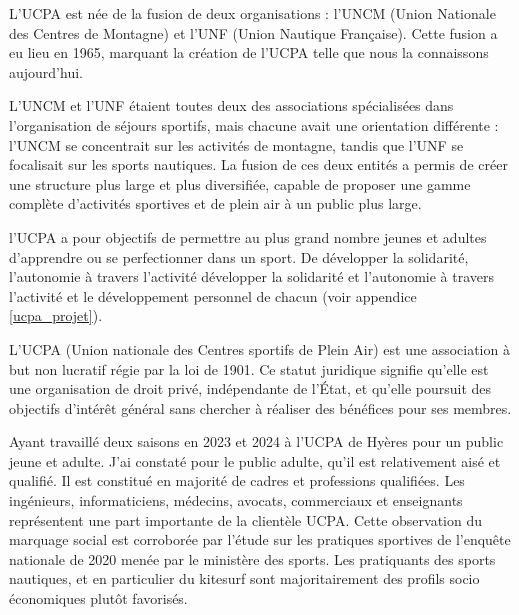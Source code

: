 \documentclass[11pt,a4paper]{report}
\begin{document}

L'UCPA est  née de la fusion de deux organisations : l'UNCM 
(Union Nationale des Centres de Montagne)
et l'UNF (Union Nautique Française). Cette fusion a eu lieu en
1965, marquant la création de l'UCPA telle que nous la connaissons
aujourd'hui.

L'UNCM et l'UNF étaient toutes deux des associations spécialisées
dans l'organisation de  séjours sportifs, mais chacune avait une
orientation différente : l'UNCM se concentrait sur les activités 
de montagne, tandis que l'UNF se focalisait sur les sports nautiques. 
La fusion de ces deux entités a permis de créer une structure plus 
large et plus diversifiée, capable de proposer une gamme complète 
d'activités sportives et de plein air à un public plus large.


l'UCPA a pour objectifs de permettre au plus grand nombre jeunes et adultes
d'apprendre ou se perfectionner dans un sport. De développer la solidarité,
l'autonomie à travers l'activité développer la solidarité et l'autonomie
à travers l'activité et le développement personnel de chacun 
(voir appendice \ref{ucpa_projet}).


L'UCPA (Union nationale des Centres sportifs de Plein Air) est une association
à but non lucratif régie par la loi de 1901. Ce statut juridique signifie
qu'elle est une organisation de droit privé, indépendante de l'État, et 
qu'elle poursuit des objectifs d'intérêt général sans chercher à 
réaliser des bénéfices pour ses membres.

Ayant travaillé deux saisons en 2023 et 2024 à l'UCPA de Hyères pour 
un public jeune et adulte. J'ai  constaté pour le public 
adulte, qu'il est relativement aisé et qualifié. Il est
constitué en majorité de cadres et professions qualifiées. Les
ingénieurs, informaticiens, médecins, avocats, commerciaux et enseignants
représentent une part importante de la clientèle UCPA.
Cette observation du marquage social  est corroborée par l'étude sur 
les pratiques sportives de l'enqu\^ete nationale de
2020 menée par le ministère des sports\cite{injep}. Les pratiquants
des sports nautiques, et en particulier du kitesurf sont majoritairement
des profils socio économiques plut\^ot favorisés.
\end{document}
